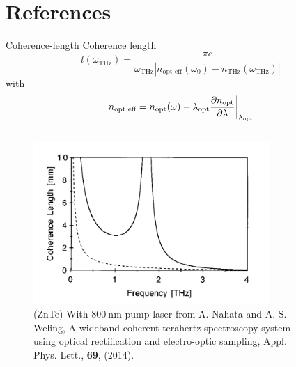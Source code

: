\documentclass[aspectratio=1610, 9pt]{beamer}
\begin{document}
\section{References }
\printbibliography

\begin{frame}{Coherence-length}
Coherence length \nocite{coherence_legnth}
\begin{equation}
    l(\omega_{\text{THz}}) = \frac{\pi c}{\omega_{\text{THz}} \left | n_\text{opt eff}(\omega_0) - n_{\text{THz}}(\omega_{\text{THz}})\right |}
\end{equation}
with 
\begin{equation}
    n_{\text{opt eff}} = n_\text{opt}(\omega) - \lambda_\text{opt}\frac{\partial n_\text{opt}}{\partial \lambda}\biggl{|}_{\lambda_\text{opt}}  
\end{equation}
\begin{center}
  \begin{columns}
    \begin{column}{.4\textwidth}
    \begin{figure}
      \includegraphics[width=0.9\textwidth]{images/coherence_length_ZnTe.png}
      \caption{\tiny{\textcolor{tugreen}{(ZnTe) With $\SI{800}{\nano\meter}$ pump laser} from  A. Nahata and A. S. Weling, A wideband coherent terahertz spectroscopy system using optical rectification and electro-optic sampling, Appl. Phys. Lett., \textbf{69}, (2014)\nocite{coherence_legnth}.}}
    \end{figure}%
    \end{column}
    \begin{column}{.4\textwidth}
    \begin{figure}

\end{figure}
\end{column}
\end{columns}
\end{center}
\end{frame}
\end{document}
